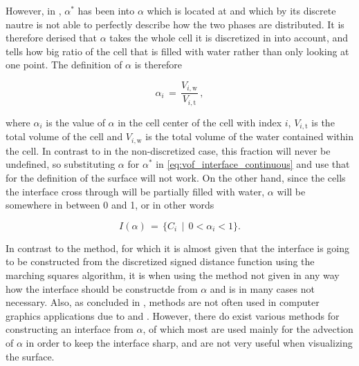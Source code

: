 However, in \thiswork, $\alpha^*$ has been \discretized into $\alpha$ which is located at  and which by its discrete nautre is not able to perfectly describe how the two phases are distributed. It is therefore derised that $\alpha$ takes the whole cell it is discretized in into account, and tells how big ratio of the cell that is filled with water rather than only looking at one point. The definition of $\alpha$ is therefore

\begin{equation} \label{eq:phase_fraction_discretized}
\alpha_i \,=\, \frac{V_{i,\text{w}}}{V_{i,\text{t}}}\,,
\end{equation}

where $\alpha_i$ is the value of $\alpha$ in the cell center of the cell with index $i$, $V_{i,\text{t}}$ is the total volume of the cell and $V_{i,\text{w}}$ is the total volume of the water contained within the cell. In contrast to in the non-discretized case, this fraction will never be undefined, so substituting $\alpha$ for $\alpha^*$ in \eqref{eq:vof_interface_continuous} and use that for the definition of the surface will not work. On the other hand, since the cells the interface cross through will be partially filled with water, $\alpha$ will be somewhere in between 0 and 1, or in other words

\begin{equation} \label{eq:vof_interface_discrete}
I(\alpha) \,=\, \{C_i \,\mid\, 0 < \alpha_i < 1\}.
\end{equation}


In contrast to the \LS method, for which it is almost given that the interface is going to be constructed from the discretized signed distance function using the marching squares algorithm, it is when using the \VOF method not given in any way how the interface should be constructde from $\alpha$ and is in many cases not necessary. Also, as concluded in \citep{Wojtan2009}, \VOF methods are not often used in computer graphics applications due to  and . However, there do exist various methods for constructing an interface from $\alpha$, of which most are used mainly for the advection of $\alpha$ in order to keep the interface sharp, and are not very useful when visualizing the surface.


